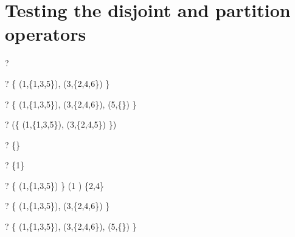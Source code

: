 \documentclass{article}
\begin{document}
\section{Testing the disjoint and partition operators}
\begin{zed} \vdash? \disjoint {} \end{zed}
\begin{zed} \vdash? \disjoint \{ (1,\{1,3,5\}), (3,\{2,4,6\}) \} \end{zed}
\begin{zed} \vdash? \disjoint \{ (1,\{1,3,5\}), (3,\{2,4,6\}), (5,\{\}) \} \end{zed}
\begin{zed} \vdash? \lnot (\disjoint \{ (1,\{1,3,5\}), (3,\{2,4,5\}) \}) \end{zed}

\begin{zed} \vdash? \emptyset[\nat \cross \power\nat] \partition \{\} \end{zed}
\begin{zed} \vdash? \lnot \emptyset[\nat \cross \power\nat] \partition \{1\} \end{zed}
\begin{zed} \vdash? \{ (1,\{1,3,5\}) \} \partition (1 ) \setminus \{2,4\} \end{zed}
\begin{zed} \vdash? \{ (1,\{1,3,5\}), (3,\{2,4,6\}) \}   \end{zed}
\begin{zed} \vdash? \{ (1,\{1,3,5\}), (3,\{2,4,6\}), (5,\{\}) \}   \end{zed}
\end{document}
